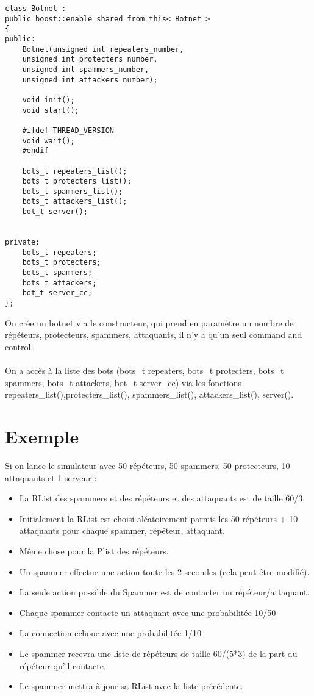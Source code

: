 \documentclass[11pt]{article}
\begin{document}
\begin{minipage}[c]{.46\linewidth}
\begin{verbatim} 
class Botnet : 
public boost::enable_shared_from_this< Botnet >
{
public:
	Botnet(unsigned int repeaters_number, 
	unsigned int protecters_number, 
	unsigned int spammers_number, 
	unsigned int attackers_number);
		   
	void init();
	void start();
	
	#ifdef THREAD_VERSION
	void wait();
	#endif
	
	bots_t repeaters_list();
	bots_t protecters_list();
	bots_t spammers_list();
	bots_t attackers_list();
	bot_t server();
	
	
private:	
	bots_t repeaters;
	bots_t protecters;
	bots_t spammers;
	bots_t attackers;
	bot_t server_cc;
};
\end{verbatim}	
\end{minipage} \hfill
\begin{minipage}[c]{.46\linewidth}
On crée un botnet via le constructeur, qui prend en paramètre un nombre de répéteurs, protecteurs, spammers, attaquants, il n'y a qu'un seul command and control.\\\\On a accès à la liste des bots (bots\_t repeaters, bots\_t protecters, bots\_t spammers, bots\_t attackers, bot\_t server\_cc) via les fonctions repeaters\_list(),protecters\_list(), spammers\_list(), attackers\_list(), server().
\end{minipage}
\newpage


\section{Exemple}
Si on lance le simulateur avec 50 répéteurs, 50 spammers, 50 protecteurs, 10 attaquants et 1 serveur :
\begin{itemize}
 \item La RList des spammers et des répéteurs et des attaquants est de taille 60/3.
 \item Initialement la RList est choisi aléatoirement parmis les 50 répéteurs + 10 attaquants pour chaque spammer, répéteur, attaquant.
 \item Même chose pour la Plist des répéteurs.
 \item Un spammer effectue une action toute les 2 secondes (cela peut être modifié).
 \item La seule action possible du Spammer est de contacter un répéteur/attaquant.
 \item Chaque spammer contacte un attaquant avec une probabilitée 10/50
 \item La connection echoue avec une probabilitée 1/10
 \item Le spammer recevra une liste de répéteurs de taille 60/(5*3) de la part du répéteur qu'il contacte.
 \item Le spammer mettra à jour sa RList avec la liste précédente.
\end{itemize}
\newpage
\end{document}
